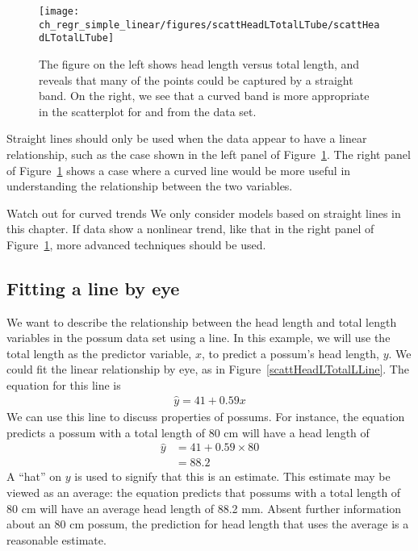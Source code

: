 \begin{figure}
   \centering
   \texttt{[image: ch\_regr\_simple\_linear/figures/scattHeadLTotalLTube/scattHeadLTotalLTube]}
   \caption{The figure on the left shows head length versus total length, and reveals that many of the points could be captured by a straight band. On the right, we see that a curved band is more appropriate in the scatterplot for  and  from the  data set.}
   \label{scattHeadLTotalLTube}
\end{figure}

Straight lines should only be used when the data appear to have a linear relationship, such as the case shown in the left panel of Figure~\ref{scattHeadLTotalLTube}. The right panel of Figure~\ref{scattHeadLTotalLTube} shows a case where a curved line would be more useful in understanding the relationship between the two variables.

\begin{caution}
{Watch out for curved trends}
{We only consider models based on straight lines in this chapter. If data show a nonlinear trend, like that in the right panel of Figure~\ref{scattHeadLTotalLTube}, more advanced techniques should be used.\vspace{0.7mm}}
\end{caution}

\subsection{Fitting a line by eye}

We want to describe the relationship between the head length and total length variables in the possum data set using a line. In this example, we will use the total length as the predictor variable, $x$, to predict a possum's head length, $y$. We could fit the linear relationship by eye, as in Figure~\ref{scattHeadLTotalLLine}. The equation for this line is
\begin{eqnarray}
\hat{y} = 41 + 0.59x
\label{headLLinModTotalL}
\end{eqnarray}
We can use this line to discuss properties of possums. For instance, the equation predicts a possum with a total length of 80 cm will have a head length of
\begin{align*}
\hat{y} &= 41 + 0.59\times 80 \\
	&= 88.2 %
\end{align*}
A ``hat'' on $y$ is used to signify that this is an estimate. This estimate may be viewed as an average: the equation predicts that possums with a total length of 80 cm will have an average head length of 88.2 mm. Absent further information about an 80 cm possum, the prediction for head length that uses the average is a reasonable estimate.

